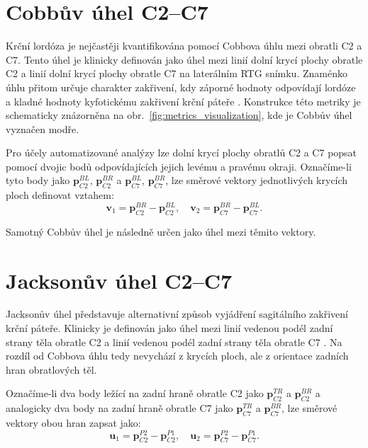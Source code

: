\documentclass[male,czech,api_bc]{kitheses}
\begin{document}
\section*{Cobbův úhel C2--C7}

Krční lordóza je nejčastěji kvantifikována pomocí Cobbova úhlu mezi obratli C2 a C7. Tento úhel je klinicky definován jako úhel mezi linií dolní krycí plochy obratle C2 a linií dolní krycí plochy obratle C7 na laterálním RTG snímku. Znaménko úhlu přitom určuje charakter zakřivení, kdy záporné hodnoty odpovídají lordóze a kladné hodnoty kyfotickému zakřivení krční páteře \cite{Bolcha2025}. Konstrukce této metriky je schematicky znázorněna na obr.~\ref{fig:metrics_visualization}, kde je Cobbův úhel vyznačen modře.

Pro účely automatizované analýzy lze dolní krycí plochy obratlů C2 a C7 popsat pomocí dvojic bodů odpovídajících jejich levému a pravému okraji. Označíme-li tyto body jako $\mathbf{p}_{C2}^{BL}$, $\mathbf{p}_{C2}^{BR}$ a $\mathbf{p}_{C7}^{BL}$, $\mathbf{p}_{C7}^{BR}$, lze směrové vektory jednotlivých krycích ploch definovat vztahem:
\begin{equation}\label{eq:vectors_cobb}
\mathbf{v}_1 = \mathbf{p}_{C2}^{BR} - \mathbf{p}_{C2}^{BL}, \quad
\mathbf{v}_2 = \mathbf{p}_{C7}^{BR} - \mathbf{p}_{C7}^{BL}.
\end{equation}

Samotný Cobbův úhel je následně určen jako úhel mezi těmito vektory.

\section*{Jacksonův úhel C2--C7}

Jacksonův úhel představuje alternativní způsob vyjádření sagitálního zakřivení krční páteře. Klinicky je definován jako úhel mezi linií vedenou podél zadní strany těla obratle C2 a linií vedenou podél zadní strany těla obratle C7 \cite{Bolcha2025}. Na rozdíl od Cobbova úhlu tedy nevychází z krycích ploch, ale z orientace zadních hran obratlových těl.

Označíme-li dva body ležící na zadní hraně obratle C2 jako $\mathbf{p}_{C2}^{TR}$ a $\mathbf{p}_{C2}^{BR}$ a analogicky dva body na zadní hraně obratle C7 jako $\mathbf{p}_{C7}^{TR}$ a $\mathbf{p}_{C7}^{BR}$, lze směrové vektory obou hran zapsat jako:
\begin{equation}
\mathbf{u}_1 = \mathbf{p}_{C2}^{P2} - \mathbf{p}_{C2}^{P1}, \quad
\mathbf{u}_2 = \mathbf{p}_{C7}^{P2} - \mathbf{p}_{C7}^{P1}.
\end{equation}
\end{document}
